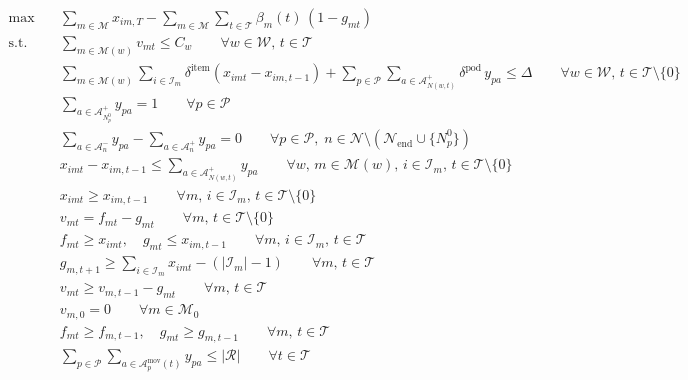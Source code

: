 \documentclass[a4paper,10pt]{article}
\begin{document}
\begin{align}
    \max \quad
    & \sum_{m \in \mathcal{M}} x_{im,T}
      - \sum_{m \in \mathcal{M}} \sum_{t \in \mathcal{T}} \beta_m(t)\,(1 - g_{mt})
      \label{M2_Obj} \\[4pt]
    \text{s.t.} \quad
    & \sum_{m \in \mathcal{M}(w)} v_{mt} \le C_w
      \qquad \forall w \in \mathcal{W},\, t \in \mathcal{T}
      \label{M2_Constr1} \\
    & \sum_{m \in \mathcal{M}(w)} \sum_{i \in \mathcal{I}_m}
      \delta^{\text{item}} (x_{imt} - x_{im,t-1})
      + \sum_{p \in \mathcal{P}} \sum_{a \in \mathcal{A}^+_{N(w,t)}}
      \delta^{\text{pod}}\, y_{pa}
      \le \Delta
      \qquad \forall w \in \mathcal{W},\, t \in \mathcal{T} \setminus \{0\}
      \label{M2_Constr2} \\
    & \sum_{a \in \mathcal{A}^+_{N_p^0}} y_{pa} = 1
      \qquad \forall p \in \mathcal{P}
      \label{M2_Constr3} \\
    & \sum_{a \in \mathcal{A}^-_{n}} y_{pa}
      - \sum_{a \in \mathcal{A}^+_{n}} y_{pa} = 0
      \qquad \forall p \in \mathcal{P},\;
              n \in \mathcal{N} \setminus \left(\mathcal{N}_{\text{end}}
              \cup \{N_p^0\}\right)
      \label{M2_Constr4} \\
    & x_{imt} - x_{im,t-1}
      \le \sum_{a \in \mathcal{A}^+_{N(w,t)}} y_{pa}
      \qquad \forall w,\, m \in \mathcal{M}(w),\, i \in \mathcal{I}_m,\,
              t \in \mathcal{T} \setminus \{0\} \\
    & x_{imt} \ge x_{im,t-1}
      \qquad \forall m,\, i \in \mathcal{I}_m,\, t \in \mathcal{T} \setminus \{0\} \\
    & v_{mt} = f_{mt} - g_{mt}
      \qquad \forall m,\, t \in \mathcal{T} \setminus \{0\} \\
    & f_{mt} \ge x_{imt},\quad g_{mt} \le x_{im,t-1}
      \qquad \forall m,\, i \in \mathcal{I}_m,\, t \in \mathcal{T} \\
    & g_{m,t+1} \ge \sum_{i \in \mathcal{I}_m} x_{imt} - (|\mathcal{I}_m| - 1)
      \qquad \forall m,\, t \in \mathcal{T} \\
    & v_{mt} \ge v_{m,t-1} - g_{mt}
      \qquad \forall m,\, t \in \mathcal{T}
      \label{Enforcing_IC} \\
    & v_{m,0} = 0
      \qquad \forall m \in \mathcal{M}_0
      \label{IC} \\
    & f_{mt} \ge f_{m,t-1},\quad g_{mt} \ge g_{m,t-1}
      \qquad \forall m,\, t \in \mathcal{T} \\
    & \sum_{p \in \mathcal{P}} \sum_{a \in \mathcal{A}^{\text{mov}}_p(t)} y_{pa}
      \le |\mathcal{R}|
      \qquad \forall t \in \mathcal{T}
      \label{max_active_pods}
\end{align}
\end{document}
